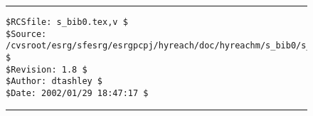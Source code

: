\noindent\begin{figure}[!b]
\noindent\rule[-0.25in]{\textwidth}{1pt}
\begin{tiny}
\begin{verbatim}
$RCSfile: s_bib0.tex,v $
$Source: /cvsroot/esrg/sfesrg/esrgpcpj/hyreach/doc/hyreachm/s_bib0/s_bib0.tex,v $
$Revision: 1.8 $
$Author: dtashley $
$Date: 2002/01/29 18:47:17 $
\end{verbatim}
\end{tiny}
\noindent\rule[0.25in]{\textwidth}{1pt}
\end{figure}
%
%
%
%
%
%
%
%

